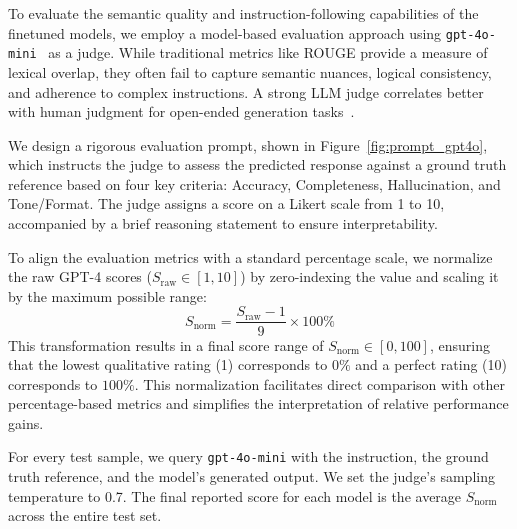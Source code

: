 \documentclass{article}
\theoremstyle{plain}
\theoremstyle{definition}
\theoremstyle{remark}
\begin{document}
To evaluate the semantic quality and instruction-following capabilities of the finetuned models, we employ a model-based evaluation approach using \texttt{gpt-4o-mini}~\cite{hurst2024gpt} as a judge. While traditional metrics like ROUGE provide a measure of lexical overlap, they often fail to capture semantic nuances, logical consistency, and adherence to complex instructions. A strong LLM judge correlates better with human judgment for open-ended generation tasks~\cite{zheng2023judging}.

We design a rigorous evaluation prompt, shown in Figure~\ref{fig:prompt_gpt4o}, which instructs the judge to assess the predicted response against a ground truth reference based on four key criteria: Accuracy, Completeness, Hallucination, and Tone/Format. The judge assigns a score on a Likert scale from 1 to 10, accompanied by a brief reasoning statement to ensure interpretability.

To align the evaluation metrics with a standard percentage scale, we normalize the raw GPT-4 scores ($S_{\text{raw}} \in [1, 10]$) by zero-indexing the value and scaling it by the maximum possible range:
\begin{equation}
    S_{\text{norm}} = \frac{S_{\text{raw}} - 1}{9} \times 100\%
\end{equation}
This transformation results in a final score range of $S_{\text{norm}} \in [0, 100]$, ensuring that the lowest qualitative rating (1) corresponds to $0\%$ and a perfect rating (10) corresponds to $100\%$. This normalization facilitates direct comparison with other percentage-based metrics and simplifies the interpretation of relative performance gains.

For every test sample, we query \texttt{gpt-4o-mini} with the instruction, the ground truth reference, and the model's generated output. We set the judge's sampling temperature to 0.7. The final reported score for each model is the average $S_{\text{norm}}$ across the entire test set.



\end{document}
